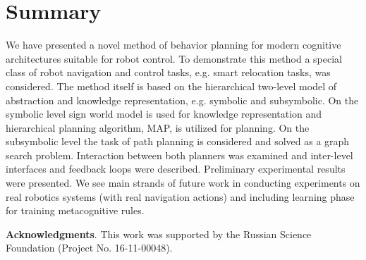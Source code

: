 \documentclass[procedia]{easychair}
\begin{document}
\section{Summary}
\label{sect:summary}

We have presented a novel method of behavior planning for modern cognitive architectures suitable for robot control. To demonstrate this method a special class of robot navigation and control tasks, e.g. smart relocation tasks, was considered. The method itself is based on the hierarchical two-level model of abstraction and knowledge representation, e.g. symbolic and subsymbolic. On the symbolic level sign world model is used for knowledge representation and hierarchical planning algorithm, MAP, is utilized for planning. On the subsymbolic level the task of path planning is considered and solved as a graph search problem. Interaction between both planners was examined and inter-level interfaces and feedback loops were described. Preliminary experimental results were presented. We see main strands of future work in conducting experiments on real robotics systems (with real navigation actions) and including learning phase for training metacognitive rules.

\textbf{Acknowledgments}. This work was supported by the Russian Science
Foundation (Project No. 16-11-00048).
%
\label{sect:bib}

%
%
%

\end{document}
